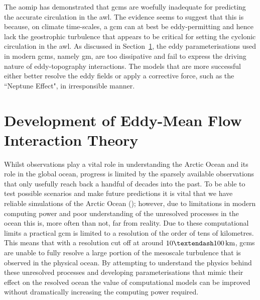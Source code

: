 \documentclass[12pt,a4paper]{report}
\newcommand*\secref[1]{Section~\ref{#1}}
\begin{document}
The \gls{aomip} has demonstrated that \glspl{gcm} are woefully inadequate for predicting the
accurate circulation in the \gls{awl}. The evidence seems to suggest that this is because, on 
climate time-scales, a \gls{gcm} can at best be eddy-permitting and hence
lack the geostrophic turbulence that appears to be critical for setting the 
cyclonic circulation in the \gls{awl}. As discussed in \secref{meaneddyinteractiontheory},
the eddy parameterisations used in modern \glspl{gcm}, namely \gls{gm}, are too 
dissipative and fail to express the driving nature of eddy-topography interactions. 
The models that are more successful either better resolve the eddy fields or apply 
a corrective force, such as the ``Neptune Effect", in irresponsible manner. 

\chapter{Development of Eddy-Mean Flow Interaction Theory}

\label{meaneddyinteractiontheory}

 Whilst observations play a vital role in understanding the Arctic
 Ocean and its role in the global ocean, progress is limited by the sparsely available
 observations that only usefully reach back a handful of decades into the past.
 To be able to test possible scenarios and make future predictions it is vital
 that we have reliable simulations of the Arctic Ocean (\cite{proshutinsky2008toward});
 however, due to limitations
 in modern computing power and poor understanding of the unresolved processes 
 in the ocean this is, more often than not, far from reality.
 Due to these computational limits a practical \gls{gcm} is 
 limited to a  resolution of the order of tens of kilometres. This means that with a 
 resolution  cut off at around $10 \textendash 100 \, \mathrm{km}$, 
 \glspl{gcm} are unable to fully resolve a large portion of the mesoscale turbulence that is
 observed in the physical ocean.
 By attempting  to understand the physics behind these unresolved processes 
 and developing parameterisations that mimic their effect on the resolved ocean
 the value of computational models can be improved without dramatically increasing the
 computing power required.  
 
\end{document}
